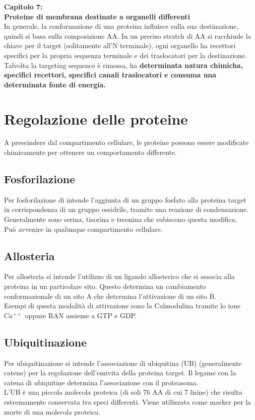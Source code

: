 \Huge\textbf{Capitolo 7: \\Proteine di membrana destinate a organelli differenti}\\

\small
In generale, la conformazione di una proteina influisce sulla sua destinazione, quindi si basa sulla composizione AA. In un preciso stratch di AA si racchiude la chiave per il target (solitamente all'N terminale), ogni organello ha recettori specifici per la propria sequenza terminale e dei traslocatori per la destinazione. 
Talvolta la targeting sequence è rimossa, ha \textbf{determinata natura chimicha, specifici recettori, specifici canali traslocatori e consuma una determinata fonte di energia.}

\section{Regolazione delle proteine}
    A prescindere dal compartimento cellulare, le proteine possono essere modificate chimicamente per ottenere un comportamento differente. 
    \subsection{Fosforilazione}
        Per fosforilazione di intende l'aggiunta di un gruppo fosfato alla proteina target in corrispondenza di un gruppo ossidrile, tramite una reazione di condensazione. Generalmente sono serina, tisorina e treonina che subiscono questa modifica. \\
        Può avvenire in qualunque compartimento cellulare.
        
    \subsection{Allosteria}
        Per allosteria si intende l'utilizzo di un ligando allosterico che si associa alla proteina in un particolare sito. Questo determina un cambiamento conformazionale di un sito A che determina l'attivazione di un sito B.\\
        Esempi di questa modalità di attivazione sono la Calmodulina tramite lo ione $Ca^{++}$ oppure RAN assieme a GTP e GDP.
        
    \subsection{Ubiquitinazione}
        Per ubiquitinazione si intende l'associazione di ubiquitina (UB) (generalmente catene) per la regolazione dell'emivita della proteina target. Il legame con la catena di ubiquitine determina l'associazione con il proteasoma. \\
        L'UB è una piccola molecola proteica (di soli 76 AA di cui 7 lisine) che risulta estremamente conservata tra speci differenti. Viene utilizzata come marker per la morte di una molecola proteica.\\
            

